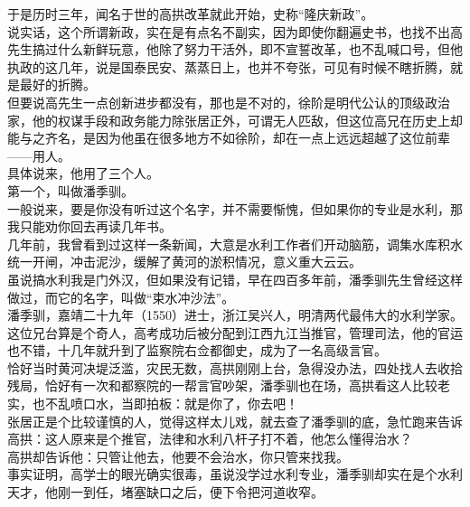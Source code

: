 \begin{multicols}{\theparacolNo}
于是历时三年，闻名于世的高拱改革就此开始，史称“隆庆新政”。\\

说实话，这个所谓新政，实在是有点名不副实，因为即使你翻遍史书，也找不出高先生搞过什么新鲜玩意，他除了努力干活外，即不宣誓改革，也不乱喊口号，但他执政的这几年，说是国泰民安、蒸蒸日上，也并不夸张，可见有时候不瞎折腾，就是最好的折腾。\\

但要说高先生一点创新进步都没有，那也是不对的，徐阶是明代公认的顶级政治家，他的权谋手段和政务能力除张居正外，可谓无人匹敌，但这位高兄在历史上却能与之齐名，是因为他虽在很多地方不如徐阶，却在一点上远远超越了这位前辈——用人。\\

具体说来，他用了三个人。\\

第一个，叫做潘季驯。\\

一般说来，要是你没有听过这个名字，并不需要惭愧，但如果你的专业是水利，那我只能劝你回去再读几年书。\\

几年前，我曾看到过这样一条新闻，大意是水利工作者们开动脑筋，调集水库积水统一开闸，冲击泥沙，缓解了黄河的淤积情况，意义重大云云。\\

虽说搞水利我是门外汉，但如果没有记错，早在四百多年前，潘季驯先生曾经这样做过，而它的名字，叫做“束水冲沙法”。\\

潘季驯，嘉靖二十九年（1550）进士，浙江吴兴人，明清两代最伟大的水利学家。\\

这位兄台算是个奇人，高考成功后被分配到江西九江当推官，管理司法，他的官运也不错，十几年就升到了监察院右佥都御史，成为了一名高级言官。\\

恰好当时黄河决堤泛滥，灾民无数，高拱刚刚上台，急得没办法，四处找人去收拾残局，恰好有一次和都察院的一帮言官吵架，潘季驯也在场，高拱看这人比较老实，也不乱喷口水，当即拍板：就是你了，你去吧！\\

张居正是个比较谨慎的人，觉得这样太儿戏，就去查了潘季驯的底，急忙跑来告诉高拱：这人原来是个推官，法律和水利八杆子打不着，他怎么懂得治水？\\

高拱却告诉他：只管让他去，他要不会治水，你只管来找我。\\

事实证明，高学士的眼光确实很毒，虽说没学过水利专业，潘季驯却实在是个水利天才，他刚一到任，堵塞缺口之后，便下令把河道收窄。\\


\end{multicols}
